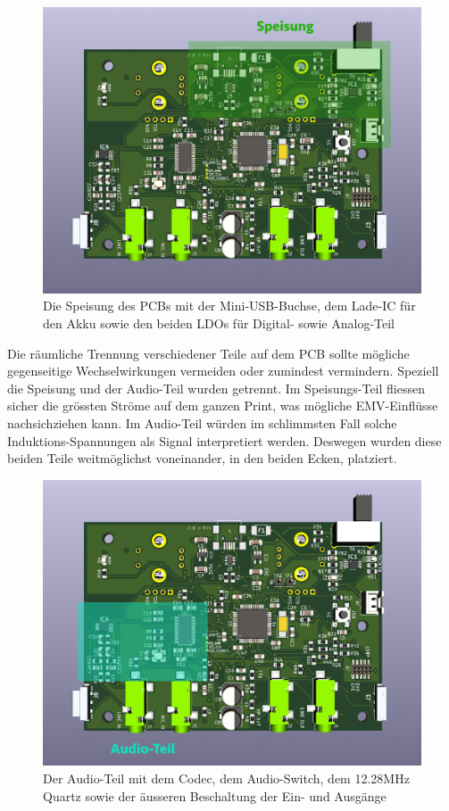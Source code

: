 \begin{figure} [H]
\begin{center}
 \includegraphics[scale=0.37]{../graphics/PCB-Layout_PWR.jpg}
 \caption{Die Speisung des PCBs mit der Mini-USB-Buchse, dem Lade-IC für den Akku sowie den beiden LDOs für Digital- sowie Analog-Teil}
\label{fig:PCB_PWR}
\end{center}
\end{figure}

Die räumliche Trennung verschiedener Teile auf dem PCB sollte mögliche gegenseitige Wechselwirkungen vermeiden oder zumindest vermindern. Speziell die Speisung und der Audio-Teil wurden getrennt. Im Speisungs-Teil fliessen sicher die grössten Ströme auf dem ganzen Print, was mögliche EMV-Einflüsse nachsichziehen kann. Im Audio-Teil würden im schlimmsten Fall solche Induktions-Spannungen als Signal interpretiert werden. Deswegen wurden diese beiden Teile weitmöglichst voneinander, in den beiden Ecken, platziert.

\begin{figure} [H]
\begin{center}
 \includegraphics[scale=0.37]{../graphics/PCB-Layout_AUDIO.jpg}
 \caption{Der Audio-Teil mit dem Codec, dem Audio-Switch, dem 12.28MHz Quartz sowie der äusseren Beschaltung der Ein- und Ausgänge}
\label{fig:PCB_AUDIO}
\end{center}
\end{figure}

